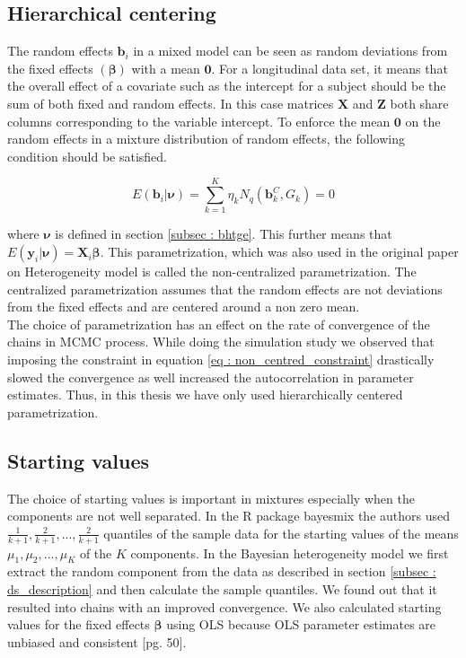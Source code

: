 \subsection{Hierarchical centering}
The random effects $\boldsymbol{b}_i$ in a mixed model can be seen as random deviations from the fixed effects $(\boldsymbol{\beta})$ with a mean $\boldsymbol{0}$. For a longitudinal data set, it means that the overall effect of a covariate such as the intercept for a subject should be the sum of both fixed and random effects. In this case matrices $\boldsymbol{X}$ and $\boldsymbol{Z}$ both share columns corresponding to the variable intercept. To enforce the mean $\boldsymbol{0}$ on the random effects in a mixture distribution of random effects, the following condition should be satisfied.

\begin{equation}
\label{eq : non_centred_constraint}
E(\boldsymbol{b}_i | \boldsymbol{\nu}) = \sum_{k=1}^{K} \eta_k N_q(\boldsymbol{b}_k^C, G_k) = 0
\end{equation}

where $\boldsymbol{\nu}$ is defined in section \ref{subsec : bhtge}. This further means that $E(\boldsymbol{y}_i | \boldsymbol{\nu}) = \boldsymbol{X}_{i}\boldsymbol{\beta}$. This parametrization, which was also used in the original paper on Heterogeneity model \citep{verbeke_linear_1996} is called the non-centralized parametrization. The centralized parametrization assumes that the random effects are not deviations from the fixed effects and are centered around a non zero mean.\\

The choice of parametrization has an effect on the rate of convergence of the chains in MCMC process. While doing the simulation study we observed that imposing the constraint in equation \ref{eq : non_centred_constraint} drastically slowed the convergence as well increased the autocorrelation in parameter estimates. Thus, in this thesis we have only used hierarchically centered parametrization.

\subsection{Starting values}
\label{subsec : choice_starting_values}
The choice of starting values is important in mixtures especially when the components are not well separated. In the R package bayesmix \citep{gruen_bayesmix:_2015} the authors used $\frac 1 {k+1}, \frac 2 {k+1}, ..., \frac 2 {k+1}$ quantiles of the sample data for the starting values of the means $\mu_1, \mu_2, ..., \mu_K$ of the $K$ components. In the Bayesian heterogeneity model we first extract the random component from the data as described in section \ref{subsec : ds_description} and then calculate the sample quantiles. We found out that it resulted into chains with an improved convergence. We also calculated starting values for the fixed effects $\boldsymbol{\beta}$ using OLS because OLS parameter estimates are unbiased and consistent [pg. 50]\citep{verbeke_linear_2009}.

